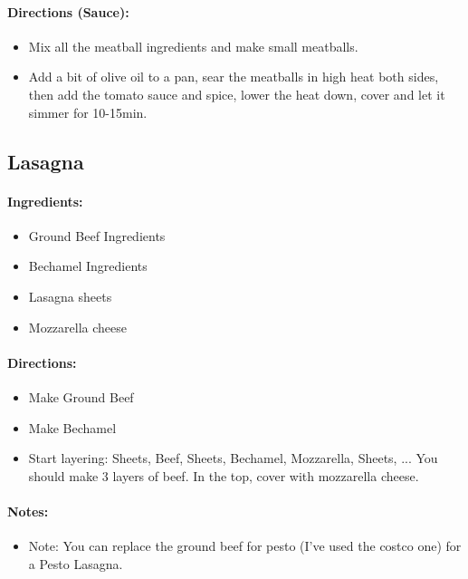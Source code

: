 \documentclass{article}
\begin{document}
\paragraph{Directions (Sauce):}
\begin{itemize}
	\item Mix all the meatball ingredients and make small meatballs.
	\item Add a bit of olive oil to a pan, sear the meatballs in high heat both sides, then add the tomato sauce and spice, lower the heat down, cover and let it simmer for 10-15min.
\end{itemize}

\subsection{Lasagna}

\paragraph{Ingredients:}

\begin{itemize}
  \item Ground Beef Ingredients
  \item Bechamel Ingredients
  \item Lasagna sheets
  \item Mozzarella cheese
\end{itemize}

\paragraph{Directions:}
\begin{itemize}
  \item Make Ground Beef
  \item Make Bechamel
  \item Start layering: Sheets, Beef, Sheets, Bechamel, Mozzarella, Sheets, ... You should make 3 layers of beef. In the top, cover with mozzarella cheese.
\end{itemize}

\paragraph{Notes:}
\begin{itemize}
	\item Note: You can replace the ground beef for pesto (I’ve used the costco one) for a Pesto Lasagna.
\end{itemize}
\end{document}
